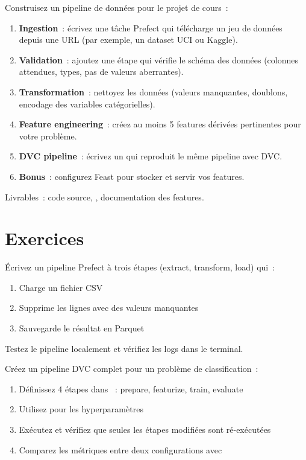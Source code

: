 \begin{miniprojet}[title=\textbf{Mini-projet 5~: Pipeline de donn\'ees complet}]
Construisez un pipeline de donn\'ees pour le projet de cours~:
\begin{enumerate}
  \item \textbf{Ingestion}~: \'ecrivez une t\^ache Prefect qui t\'el\'echarge
    un jeu de donn\'ees depuis une URL (par exemple, un dataset UCI ou Kaggle).
  \item \textbf{Validation}~: ajoutez une \'etape qui v\'erifie le sch\'ema
    des donn\'ees (colonnes attendues, types, pas de valeurs aberrantes).
  \item \textbf{Transformation}~: nettoyez les donn\'ees (valeurs manquantes,
    doublons, encodage des variables cat\'egorielles).
  \item \textbf{Feature engineering}~: cr\'eez au moins 5 features
    d\'eriv\'ees pertinentes pour votre probl\`eme.
  \item \textbf{DVC pipeline}~: \'ecrivez un  qui reproduit
    le m\^eme pipeline avec DVC.
  \item \textbf{Bonus}~: configurez Feast pour stocker et servir vos features.
\end{enumerate}
Livrables~: code source, , documentation des features.
\end{miniprojet}

\section{Exercices}
\label{sec:exercises-ch5}

\begin{exercice}
\'Ecrivez un pipeline Prefect \`a trois \'etapes (extract, transform, load)
qui~:
\begin{enumerate}
  \item Charge un fichier CSV
  \item Supprime les lignes avec des valeurs manquantes
  \item Sauvegarde le r\'esultat en Parquet
\end{enumerate}
Testez le pipeline localement et v\'erifiez les logs dans le terminal.
\end{exercice}

\begin{exercice}
Cr\'eez un pipeline DVC complet pour un probl\`eme de classification~:
\begin{enumerate}
  \item D\'efinissez 4 \'etapes dans ~: prepare, featurize,
    train, evaluate
  \item Utilisez  pour les hyperparam\`etres
  \item Ex\'ecutez  et v\'erifiez que seules les \'etapes
    modifi\'ees sont r\'e-ex\'ecut\'ees
  \item Comparez les m\'etriques entre deux configurations avec
\end{enumerate}
\end{exercice}

